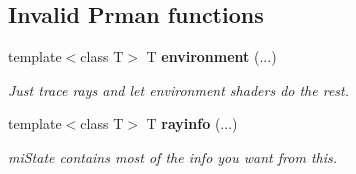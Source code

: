 \subsection*{Invalid Prman functions}
\begin{CompactItemize}
\item 
template$<$class T$>$ T {\bf environment} (...)
\begin{CompactList}\small\item\em Just trace rays and let environment shaders do the rest. \item\end{CompactList}\item 
template$<$class T$>$ T {\bf rayinfo} (...)
\begin{CompactList}\small\item\em mi\-State contains most of the info you want from this. \item\end{CompactList}\end{CompactItemize}
